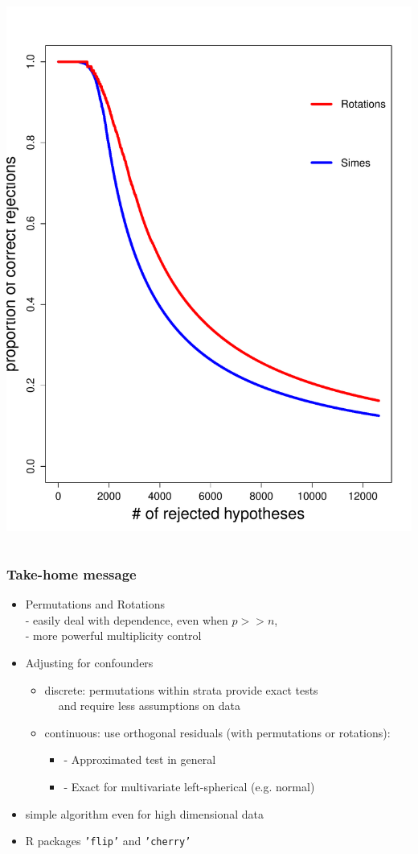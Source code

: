 \documentclass[xcolor={pdftex,dvipsnames,table}]{beamer}
\newcommand{\bi}{\begin {itemize}}
\newcommand{\ei}{\end{itemize}}
\begin{document}
\begin{frame}
\begin{columns}
\includegraphics[scale=.25]{figures_perm_covariates/ALL_proportions}


\end{columns}



\end{frame}
\begin{frame}
\frametitle{Take-home message}

\bi
\item Permutations and Rotations \\
- easily deal with dependence, even when $p>>n$,\\
- more powerful multiplicity control\\
\pause
\item Adjusting for confounders
\pause
\bi
\item[]\textcolor{myblue}{discrete:} permutations within strata provide exact tests\\
\pause
$\ \ \ \ $ and require less assumptions on data
\pause
\item[] \textcolor{myblue}{continuous:} use orthogonal residuals (with permutations or rotations):
\bi 
\item[-] Approximated test in general
\item[-] Exact for multivariate left-spherical (e.g. normal)
\ei
\ei

\item simple algorithm even for high dimensional data
\item \textcolor{redUnipd}{R packages} {\tt 'flip'} and {\tt 'cherry'}
\ei

\end{frame}
\end{document}
